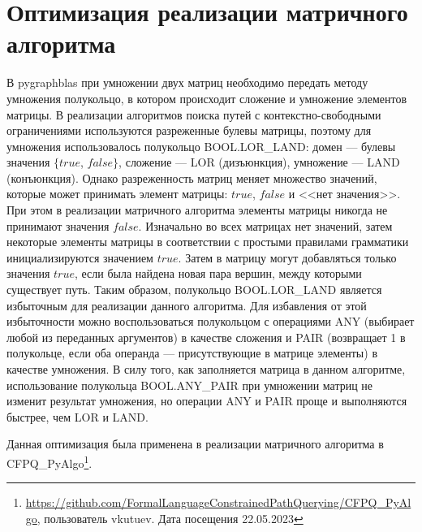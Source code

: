 \section{Оптимизация реализации матричного алгоритма}

В pygraphblas при умножении двух матриц необходимо передать методу умножения полукольцо, в котором происходит сложение и умножение элементов матрицы. В реализации алгоритмов поиска путей с контекстно-свободными ограничениями используются разреженные булевы матрицы, поэтому для умножения использовалось полукольцо BOOL.LOR\_LAND: домен --- булевы значения $\{true$, $false\}$, сложение --- LOR (дизъюнкция), умножение --- LAND (конъюнкция). Однако разреженность матриц меняет множество значений, которые может принимать элемент матрицы: $true$, $false$ и <<нет значения>>. При этом в реализации матричного алгоритма элементы матрицы никогда не принимают значения $false$. Изначально во всех матрицах нет значений, затем некоторые элементы матрицы в соответствии с простыми правилами грамматики инициализируются значением $true$. Затем в матрицу могут добавляться только значения $true$, если была найдена новая пара вершин, между которыми существует путь. Таким образом, полукольцо BOOL.LOR\_LAND является избыточным для реализации данного алгоритма. Для избавления от этой избыточности можно воспользоваться полукольцом с операциями ANY (выбирает любой из переданных аргументов) в качестве сложения и PAIR (возвращает 1 в полукольце, если оба операнда --- присутствующие в матрице элементы) в качестве умножения. В силу того, как заполняется матрица в данном алгоритме, использование полукольца BOOL.ANY\_PAIR при умножении матриц не изменит результат умножения, но операции ANY и PAIR проще и выполняются быстрее, чем LOR и LAND.

Данная оптимизация была применена в реализации матричного алгоритма в CFPQ\_PyAlgo\footnote{\url{https://github.com/FormalLanguageConstrainedPathQuerying/CFPQ_PyAlgo}, пользователь vkutuev. Дата посещения 22.05.2023}.